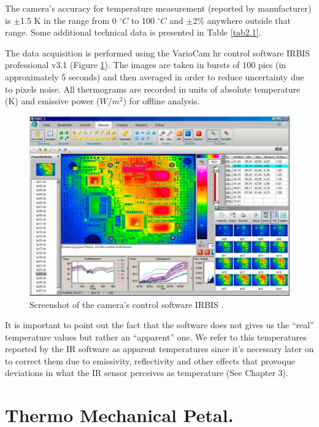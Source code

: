 		The camera's accuracy for temperature measurement (reported by manufacturer) is $\pm$1.5 K in the range from 0 $^{\circ}C$ to 100 $^{\circ}C$ and $\pm$2\% anywhere outside that range. Some additional technical data is presented in Table \ref{tab2.1}.
		
		The data acquisition is performed using the VarioCam hr control software IRBIS \textregistered\space professional v3.1 (Figure \ref{fig2.3}). The images are taken in bursts of 100 pics (in approximately 5 seconds) and then averaged in order to reduce uncertainty due to pixels noise. All thermograms are recorded in units of absolute temperature (K) and emissive power ($W/m^2$) for offline analysis.
		
		\begin{figure}[ht!]
			\centering
			\captionsetup{justification=centering,margin=2cm}
			\includegraphics[scale=0.35]{Figures/Chapter02/IRBISimage.pdf}
			\caption{Screenshot of the camera’s control software IRBIS \textregistered{}.}\label{fig2.3}
		\end{figure}

		It is important to point out the fact that the software does not gives us the “real” temperature values but rather an “apparent” one. We refer to this temperatures reported by the IR software as apparent temperatures since it's necessary later on to correct them due to emissivity, reflectivity and other effects that provoque deviations in what the IR sensor perceives as temperature (See Chapter 3).
		
	\section{Thermo Mechanical Petal.}\label{section2.3}
	
